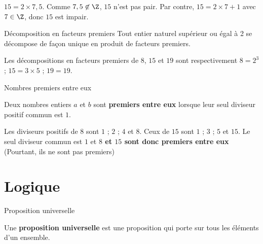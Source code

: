 \begin{pageCours}
\begin{minipage}{0.5\linewidth}
\begin{Exs}
  $15= 2 \times 7,5$. Comme $7,5 \not\in\Z$, $15$ n'est pas pair. Par contre,
  $15=2 \times 7+1$ avec $7 \in \Z$, donc $15$ est impair.
\end{Exs}
\end{minipage}


\begin{minipage}{0.5\linewidth}
  \begin{ThT}{Décomposition en facteurs premiers}
    Tout entier naturel supérieur ou égal à 2 se décompose de façon unique en produit de facteurs premiers.
  \end{ThT}
\end{minipage}
\begin{minipage}{0.5\linewidth}
\begin{Exs}
Les décompositions en facteurs premiers de $8$, $15$ et $19$ sont respectivement  
$8=2^3$ ; $15=3 \times 5$ ; $19=19$.
  
\end{Exs}
\end{minipage}

\begin{minipage}{0.5\linewidth}
  \begin{DefT}{Nombres premiers entre eux}

    Deux nombres entiers $a$ et $b$ sont \textbf{premiers entre eux}
    lorsque leur seul diviseur positif commun est $1$.
  \end{DefT}
\end{minipage}
\begin{minipage}{0.5\linewidth}
\begin{Ex}
  Les diviseurs positifs de $8$ sont $1$ ; $2$ ; $4$ et $8$. Ceux de $15$ sont
  $1$ ; $3$ ; $5$ et $15$. Le seul diviseur commun est $1$ et \textbf{$8$ et $15$ sont donc premiers entre eux} (Pourtant, ils ne sont pas premiers)
\end{Ex}
\end{minipage}




\section{Logique}

\begin{minipage}{0.5\linewidth}
\begin{DefT}{Proposition universelle}

  Une \textbf{proposition universelle} est une proposition qui porte sur tous
  les éléments d'un ensemble. 


\end{DefT}
\end{minipage}
\end{pageCours}
